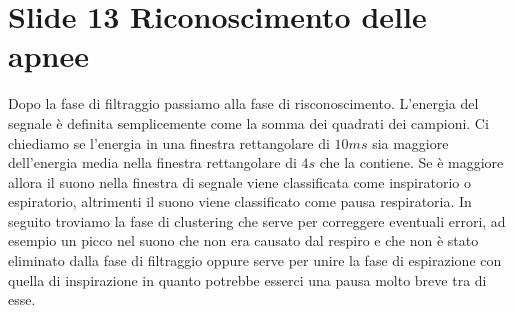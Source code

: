 \section{Slide 13 Riconoscimento delle apnee}
Dopo la fase di filtraggio passiamo alla fase di risconoscimento.
L'energia del segnale \`e definita semplicemente come la somma dei quadrati dei campioni.
Ci chiediamo se l'energia in una finestra rettangolare di $10ms$ sia maggiore dell'energia media nella finestra rettangolare di $4s$ che la contiene.
Se \`e maggiore allora il suono nella finestra di segnale viene classificata come inspiratorio o espiratorio, altrimenti il suono viene classificato come pausa respiratoria.
In seguito troviamo la fase di clustering che serve per correggere eventuali errori, ad esempio un picco nel suono che non era causato dal respiro e che non \`e stato eliminato dalla fase di filtraggio oppure serve per unire la fase di espirazione con quella di inspirazione in quanto potrebbe esserci una pausa molto breve tra di esse.